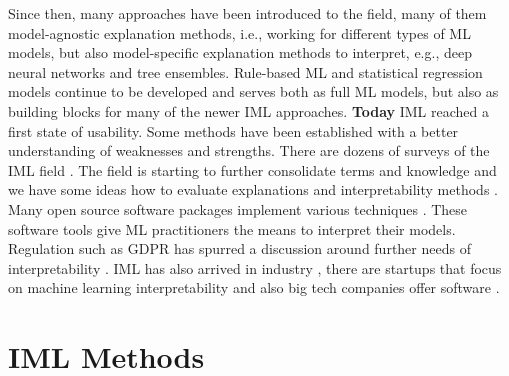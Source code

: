 \documentclass[runningheads]{llncs}
\begin{document}
Since then, many approaches have been introduced to the field, many of them model-agnostic explanation methods, i.e., working for different types of ML models, but also model-specific explanation methods to interpret, e.g., deep neural networks and tree ensembles.
Rule-based ML and statistical regression models continue to be developed and serves both as full ML models, but also as building blocks for many of the newer IML approaches.
\textbf{Today} IML reached a first state of usability.
Some methods have been established with a better understanding of weaknesses and strengths.
There are dozens of surveys of the IML field \cite{molnar2019,guidotti2018survey,vilone2020explainable,rosenfeld2019explainability,adadi2018peeking,anjomshoae2019explainable,du2019techniques,carvalho2019machine}.
The field is starting to further consolidate terms and knowledge \cite{hall2019systematic,doshi2017towards,murdoch2019definitions,samek2019towards,preece2018stakeholders} and we have some ideas how to evaluate explanations and interpretability methods \cite{mohseni2018multidisciplinary}.
Many open source software packages implement various techniques \cite{iml,biecek2018dalex,pedregosa2011scikit,klaise2020alibi,nori2019interpretml} .
These software tools give ML practitioners the means to interpret their models.
Regulation such as GDPR has spurred a discussion around further needs of interpretability \cite{wachter2017counterfactual}.
IML has also arrived in industry \cite{gade2019explainable}, there are startups that focus on machine learning interpretability and also big tech companies offer software \cite{exler2019if,arya2020ai,hall2017machine}.

\section{IML Methods}
\end{document}
